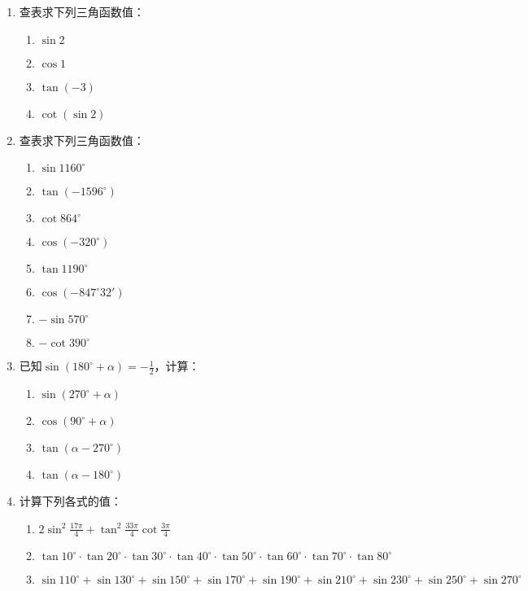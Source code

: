 \begin{enumerate}
\item 查表求下列三角函数值：
\begin{multicols}{2}
\begin{enumerate}
    \item $\sin2$
    \item $\cos1$
    \item $\tan(-3)$
    \item $\cot(\sin2)$
\end{enumerate}
\end{multicols}
\item 查表求下列三角函数值：
\begin{multicols}{2}
\begin{enumerate}
    \item $\sin 1160^{\circ}$
    \item $\tan (-1596^{\circ})$
    \item $\cot 864^{\circ}$
    \item $\cos(-320^{\circ})$
    \item $\tan 1190^{\circ}$
    \item $\cos(-847^{\circ}32')$
    \item $-\sin 570^{\circ}$
    \item $-\cot 390^{\circ}$
\end{enumerate}
\end{multicols}

\item 已知$\sin(180^{\circ}+\alpha)=-\frac{1}{2}$，计算：
\begin{multicols}{2}
\begin{enumerate}
    \item $\sin(270^{\circ}+\alpha)$
    \item $\cos(90^{\circ}+\alpha)$
    \item $\tan(\alpha-270^{\circ})$
    \item $\tan(\alpha-180^{\circ})$
\end{enumerate}
\end{multicols}
\item 计算下列各式的值：
\begin{enumerate}
    \item $2\sin^2\frac{17\pi}{4}+\tan^2\frac{33\pi}{4}\cot\frac{3\pi}{4}$
    \item $\tan10^{\circ}\cdot \tan20^{\circ}\cdot \tan30^{\circ}\cdot \tan40^{\circ}\cdot \tan50^{\circ}\cdot \tan60^{\circ}\cdot \tan70^{\circ}\cdot \tan80^{\circ}$
    \item $\sin110^{\circ}+\sin130^{\circ}+\sin150^{\circ}+\sin170^{\circ}+\sin190^{\circ}+\sin210^{\circ}+\sin230^{\circ}+\sin250^{\circ}+\sin270^{\circ}$
\end{enumerate}



\end{enumerate}

